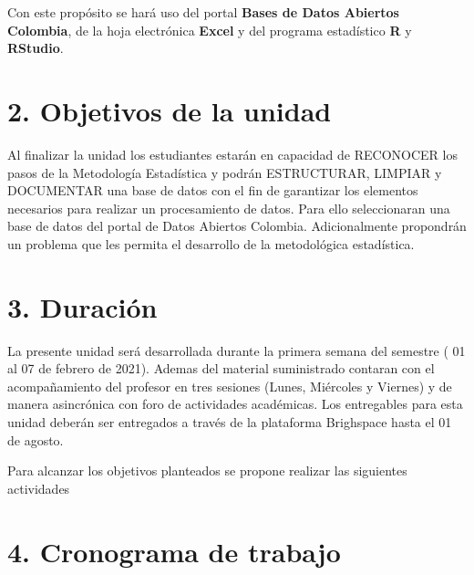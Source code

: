 \documentclass[base=hide,11pt]{elegantbook}
\begin{document}
Con este propósito se hará uso del portal \textbf{Bases de Datos Abiertos Colombia},  de la hoja electrónica \textbf{Excel} y del programa estadístico \textbf{R} y \textbf{RStudio}.\\

\section*{2. Objetivos de la unidad}

Al finalizar la unidad los estudiantes estarán  en  capacidad de  RECONOCER los  pasos de la Metodología Estadística y podrán ESTRUCTURAR, LIMPIAR y DOCUMENTAR una  base de datos con  el fin de  garantizar los elementos  necesarios  para  realizar  un  procesamiento  de  datos. Para ello seleccionaran una base de datos  del  portal de  Datos Abiertos Colombia. Adicionalmente propondrán un problema que les permita el desarrollo de la metodológica estadística. 


\section*{3. Duración}
La presente  unidad será desarrollada durante la  primera semana del semestre ( 01 al 07  de febrero de 2021). Ademas del material suministrado  contaran con el acompañamiento del profesor en tres sesiones (Lunes, Miércoles y Viernes) y de manera asincrónica con  foro de actividades académicas. Los entregables para esta unidad deberán ser entregados a través de la plataforma Brighspace hasta el  01 de agosto. 

Para alcanzar los objetivos planteados se propone realizar las siguientes actividades
% 	
\section*{4. Cronograma de trabajo}
\end{document}
